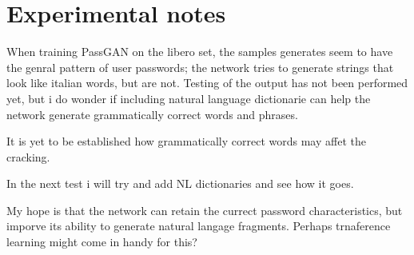 \section{Experimental notes}
When training PassGAN on the libero set, the samples generates seem to have the genral pattern of user passwords; the network tries to generate strings that look like italian words, but are not. Testing of the output has not been performed yet, but i do wonder if including natural language dictionarie can help the network generate grammatically correct words and phrases.

It is yet to be established how grammatically correct words may affet the cracking.

In the next test i will try and add NL dictionaries and see how it goes. 

My hope is that the network can retain the currect password characteristics, but imporve its ability to generate natural langage fragments. Perhaps trnaference learning might come in handy for this?

